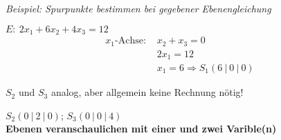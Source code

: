 
\textit{Beispiel: Spurpunkte bestimmen bei gegebener Ebenengleichung}

$E: \ 2x_1 + 6x_2 + 4x_3 = 12$
\begin{align*}
    x_1\text{-Achse: } & x_2 + x_3 = 0 \\
    & 2x_1 = 12 \\
    & x_1 = 6 \Rightarrow S_1(6 \ | \ 0 \ | \ 0)
\end{align*}

$S_2$ und $S_3$ analog, aber allgemein keine Rechnung nötig! 

$S_2(0\ | \ 2 \ | \ 0)$; $S_3(0\ | \ 0 \ | \ 4)$ \\
    
\textbf{Ebenen veranschaulichen mit einer und zwei Varible(n)} 

